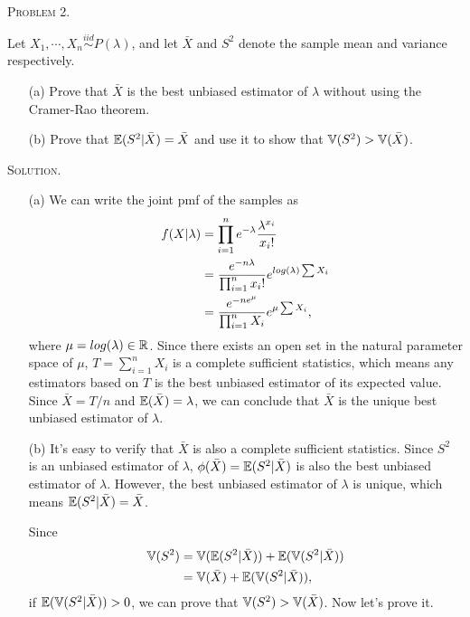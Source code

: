 \documentclass{article}
\begin{document}
\begin{CJK}{UTF8}{gbsn}
    \begin{shaded}
        \noindent\textsc{Problem 2.}\par
        Let $X_1, \cdots, X_n \mathop{\sim}\limits^{iid} P(\lambda)$, and let $\bar{X}$ and $S^2$ denote the sample mean and
        variance respectively.
        \begin{itemize}
            \item [(a)] Prove that $\bar{X}$ is the best unbiased estimator of $\lambda$ without using the Cramer-Rao theorem.
            \item [(b)] Prove that ${\mathbb E}(S^2|\bar{X}) = \bar{X}$ and use it to show that ${\mathbb V}(S^2) > {\mathbb V}(\bar{X})$.
        \end{itemize}
    \end{shaded}
    \noindent\textsc{Solution.}\par
    \begin{itemize}
        \item [(a)] We can write the joint pmf of the samples as
              \begin{align}
                  f(X|\lambda) & = \prod_{i=1}^n e^{-\lambda} \frac{\lambda^{x_i}}{x_i!} \notag              \\
                               & =  \frac{e^{-n\lambda}}{\prod_{i=1}^n x_i!} e^{log(\lambda) \sum X_i}\notag \\
                               & =  \frac{e^{-ne^{\mu}}}{\prod_{i=1}^n X_i} e^{\mu \sum X_i},\notag
              \end{align}
              where $\mu = log(\lambda) \in {\mathbb R}$. Since there exists an open set in the natural parameter space of $\mu$, $T=\sum_{i=1}^n X_i$ is a complete sufficient statistics, which means
              any estimators based on $T$ is the best unbiased estimator of its expected value.
              Since $\bar{X} = T/n$ and ${\mathbb E}(\bar{X}) = \lambda$, we can conclude that $\bar{X}$ is the unique best unbiased estimator of $\lambda$.
        \item [(b)] It's easy to verify that $\bar{X}$ is also a complete sufficient statistics. Since
              $S^2$ is an unbiased estimator of $\lambda$, $\phi(\bar{X})={\mathbb E}(S^2|\bar{X})$ is also the best
              unbiased estimator of $\lambda$. However, the best unbiased estimator of $\lambda$ is unique, which means ${\mathbb E}(S^2|\bar{X}) = \bar{X}$.

              \noindent Since
              \begin{align}
                  {\mathbb V}(S^2) & = {\mathbb V}({\mathbb E}(S^2|\bar{X})) + {\mathbb E}({\mathbb V}(S^2|\bar{X})) \notag \\
                           & = {\mathbb V}(\bar{X}) + {\mathbb E}({\mathbb V}(S^2|\bar{X})),\notag
              \end{align}
              if ${\mathbb E}({\mathbb V}(S^2|\bar{X})) > 0$, we can prove that ${\mathbb V}(S^2) > {\mathbb V}(\bar{X})$. Now
              let's prove it.


\end{itemize}
\end{CJK}
\end{document}
